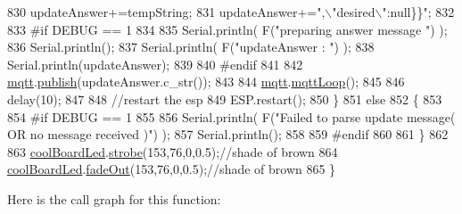 \begin{DoxyCode}
830             updateAnswer+=tempString;
831             updateAnswer+=\textcolor{stringliteral}{",\(\backslash\)"desired\(\backslash\)":null\}\}"};
832 
833 \textcolor{preprocessor}{        #if DEBUG == 1}
834 
835             Serial.println( F(\textcolor{stringliteral}{"preparing answer message "}) );
836             Serial.println();
837             Serial.println( F(\textcolor{stringliteral}{"updateAnswer : "}) );
838             Serial.println(updateAnswer);
839         
840 \textcolor{preprocessor}{        #endif  }
841 
842             \hyperlink{classCoolBoard_a2399f44d7c23c1149a335cb3b46d90f1}{mqtt}.\hyperlink{classCoolMQTT_ace977b3e90ab14b1199fe5c4fb0a13ec}{publish}(updateAnswer.c\_str());
843             
844             \hyperlink{classCoolBoard_a2399f44d7c23c1149a335cb3b46d90f1}{mqtt}.\hyperlink{classCoolMQTT_aa5eaae967b562b62cbcf2b8d81f6e5d5}{mqttLoop}();
845 
846             delay(10);
847             
848             \textcolor{comment}{//restart the esp}
849             ESP.restart();
850     \}
851     \textcolor{keywordflow}{else}
852     \{
853     
854 \textcolor{preprocessor}{    #if DEBUG == 1}
855 
856         Serial.println( F(\textcolor{stringliteral}{"Failed to parse update message( OR no message received )"}) );
857         Serial.println();
858     
859 \textcolor{preprocessor}{    #endif}
860     
861     \}
862 
863     \hyperlink{classCoolBoard_a1b1d3c684a5baa56b08486e192fd8e97}{coolBoardLed}.\hyperlink{classCoolBoardLed_ad5f0de4c628cbfbf49896042831c64ad}{strobe}(153,76,0,0.5);\textcolor{comment}{//shade of brown}
864     \hyperlink{classCoolBoard_a1b1d3c684a5baa56b08486e192fd8e97}{coolBoardLed}.\hyperlink{classCoolBoardLed_a93d545679237e8cc858324367149775c}{fadeOut}(153,76,0,0.5);\textcolor{comment}{//shade of brown                              }
865 \}
\end{DoxyCode}
Here is the call graph for this function\+:
\nopagebreak
